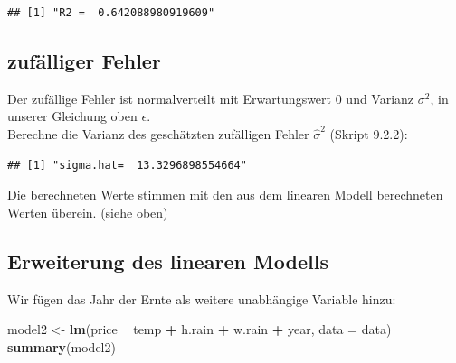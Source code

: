 \documentclass[]{article}
\newenvironment{Shaded}{\begin{snugshade}}{\end{snugshade}}
\newcommand{\DataTypeTok}[1]{\textcolor[rgb]{0.13,0.29,0.53}{#1}}
\newcommand{\DecValTok}[1]{\textcolor[rgb]{0.00,0.00,0.81}{#1}}
\newcommand{\KeywordTok}[1]{\textcolor[rgb]{0.13,0.29,0.53}{\textbf{#1}}}
\newcommand{\NormalTok}[1]{#1}
\newcommand{\OperatorTok}[1]{\textcolor[rgb]{0.81,0.36,0.00}{\textbf{#1}}}
\newcommand{\StringTok}[1]{\textcolor[rgb]{0.31,0.60,0.02}{#1}}
\begin{document}
\begin{verbatim}
## [1] "R2 =  0.642088980919609"
\end{verbatim}

\hypertarget{zufuxe4lliger-fehler}{%
\subsection{zufälliger Fehler}\label{zufuxe4lliger-fehler}}

Der zufällige Fehler ist normalverteilt mit Erwartungswert 0 und Varianz \(\sigma^2\), in unserer Gleichung oben \(\epsilon\).\\
Berechne die Varianz des geschätzten zufälligen Fehler \(\hat\sigma^2\) (Skript 9.2.2):

\begin{Shaded}
\end{Shaded}

\begin{verbatim}
## [1] "sigma.hat=  13.3296898554664"
\end{verbatim}

Die berechneten Werte stimmen mit den aus dem linearen Modell berechneten Werten überein. (siehe oben)

\hypertarget{erweiterung-des-linearen-modells}{%
\subsection{Erweiterung des linearen Modells}\label{erweiterung-des-linearen-modells}}

Wir fügen das Jahr der Ernte als weitere unabhängige Variable hinzu:

\begin{Shaded}
\begin{Highlighting}[]
\NormalTok{model2 <-}\StringTok{ }\KeywordTok{lm}\NormalTok{(price }\OperatorTok{~}\StringTok{ }\NormalTok{temp }\OperatorTok{+}\StringTok{ }\NormalTok{h.rain }\OperatorTok{+}\StringTok{ }\NormalTok{w.rain }\OperatorTok{+}\StringTok{ }\NormalTok{year, }\DataTypeTok{data =}\NormalTok{ data)}
\KeywordTok{summary}\NormalTok{(model2)}
\end{Highlighting}
\end{Shaded}
\end{document}
